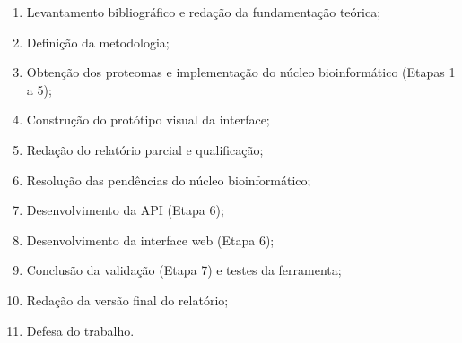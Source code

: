 \begin{enumerate}
	\item Levantamento bibliográfico e redação da fundamentação teórica;
	\item Definição da metodologia;
	\item Obtenção dos proteomas e implementação do núcleo bioinformático (Etapas 1 a 5);
	\item Construção do protótipo visual da interface;
	\item Redação do relatório parcial e qualificação;
	\item Resolução das pendências do núcleo bioinformático;
	\item Desenvolvimento da API (Etapa 6);
	\item Desenvolvimento da interface web (Etapa 6);
	\item Conclusão da validação (Etapa 7) e testes da ferramenta;
	\item Redação da versão final do relatório;
	\item Defesa do trabalho.
\end{enumerate}
